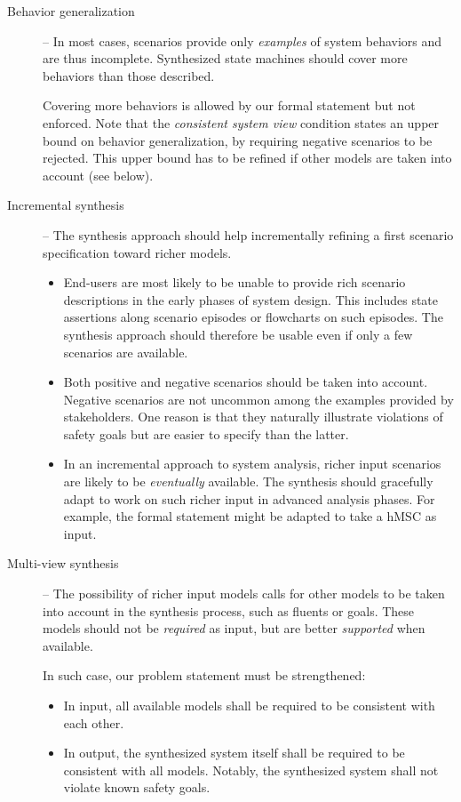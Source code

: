 \begin{description}
\item[Behavior generalization] -- In most cases, scenarios provide only \emph{examples} of system behaviors and are thus incomplete. Synthesized state machines should cover more behaviors than those described. 

Covering more behaviors is allowed by our formal statement but not enforced. Note that the \emph{consistent system view} condition states an upper bound on behavior generalization, by requiring negative scenarios to be rejected. This upper bound has to be refined if other models are taken into account (see below).

\item[Incremental synthesis] -- The synthesis approach should help incrementally refining a first scenario specification toward richer models.
\begin{itemize}

\item End-users are most likely to be unable to provide rich scenario descriptions in the early phases of system design. This includes state assertions along scenario episodes or flowcharts on such episodes. The synthesis approach should therefore be usable even if only a few scenarios are available.

\item Both positive and negative scenarios should be taken into account. Negative scenarios are not uncommon among the examples provided by stakeholders. One reason is that they naturally illustrate violations of safety goals but are easier to specify than the latter.

\item In an incremental approach to system analysis, richer input scenarios are likely to be \emph{eventually} available. The synthesis should gracefully adapt to work on such richer input in advanced analysis phases. For example, the formal statement might be adapted to take a hMSC as input. 

\end{itemize}

\item[Multi-view synthesis] -- The possibility of richer input models calls for other models to be taken into account in the synthesis process, such as fluents or goals. These models should not be \emph{required} as input, but are better \emph{supported} when available. 

\noindent In such case, our problem statement must be strengthened: 
\begin{itemize}
\item In input, all available models shall be required to be consistent with each other. 
\item In output, the synthesized system itself shall be required to be consistent with all models. Notably, the synthesized system shall not violate known safety goals.
\end{itemize}

\end{description}

